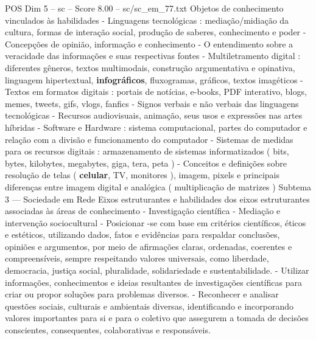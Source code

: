 \begin{textsample}{POS Dim 5 – sc – Score 8.00 – sc/sc\_em\_77.txt}
Objetos de conhecimento vinculados às habilidades - Linguagens tecnológicas : mediação/midiação da cultura, formas de interação social, produção de saberes, conhecimento e poder - Concepções de opinião, informação e conhecimento - O entendimento sobre a veracidade das informações e suas respectivas fontes - Multiletramento digital : diferentes gêneros, textos multimodais, construção argumentativa e opinativa, linguagem hipertextual, \textbf{infográficos}, fluxogramas, gráficos, textos imagéticos - Textos em formatos digitais : portais de notícias, e-books, PDF interativo, blogs, memes, tweets, gifs, vlogs, fanfics - Signos verbais e não verbais das linguagens tecnológicas - Recursos audiovisuais, animação, seus usos e expressões nas artes híbridas - Software e Hardware : sistema computacional, partes do computador e relação com a divisão e funcionamento do computador - Sistemas de medidas para os recursos digitais : armazenamento de sistemas informatizados ( bits, bytes, kilobytes, megabytes, giga, tera, peta ) - Conceitos e definições sobre resolução de telas ( \textbf{celular}, TV, monitores ), imagem, pixels e principais diferenças entre imagem digital e analógica ( multiplicação de matrizes ) Subtema 3 — Sociedade em Rede Eixos estruturantes e habilidades dos eixos estruturantes associadas às áreas de conhecimento - Investigação científica - Mediação e intervenção sociocultural - Posicionar -se com base em critérios científicos, éticos e estéticos, utilizando dados, fatos e evidências para respaldar conclusões, opiniões e argumentos, por meio de afirmações claras, ordenadas, coerentes e compreensíveis, sempre respeitando valores universais, como liberdade, democracia, justiça social, pluralidade, solidariedade e sustentabilidade. - Utilizar informações, conhecimentos e ideias resultantes de investigações científicas para criar ou propor soluções para problemas diversos. - Reconhecer e analisar questões sociais, culturais e ambientais diversas, identificando e incorporando valores importantes para si e para o coletivo que assegurem a tomada de decisões conscientes, consequentes, colaborativas e responsáveis.

\end{textsample}
